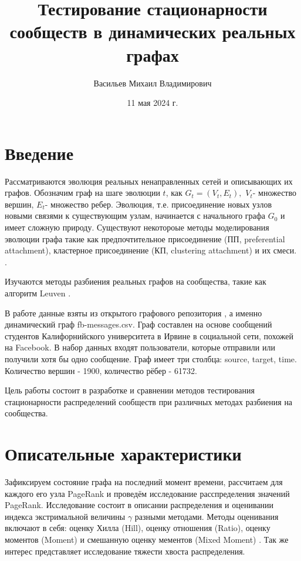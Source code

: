 \documentclass[a4paper,12pt]{article}
\begin{document}
\title{Тестирование стационарности сообществ в динамических реальных графах}



\author{Васильев Михаил Владимирович}


\date{11 мая 2024 г.}%
             



\maketitle

\section{Введение}
	Рассматриваются эволюция реальных ненаправленных сетей и описывающих их графов. 
	Обозначим граф на шаге эволюции $t$, как $G_{t}=(V_{t},E_{t}),$ $V_{t}$- множество вершин, $E_{t}$- множество ребер. Эволюция, т.е. присоединение новых узлов новыми связями к существующим узлам, начинается с начального графа $G_{0}$ и имеет сложную природу. Существуют некотороые методы моделирования эволюции графа такие как предпочтительное присоединение (ПП, preferential attachment), кластерное присоединение (КП, clustering attachment) и их смеси. \cite{book9}.
	
	Изучаются методы разбиения реальных графов на сообщества, такие как алгоритм Leuven \cite{book8}. 
	
	В работе данные взяты из открытого графового репозитория \cite{book2}, а именно динамический граф fb-messages.csv. Граф составлен на основе сообщений студентов Калифорнийского университета в Ирвине в социальной сети, похожей на Facebook. В набор данных входят пользователи, которые отправили или получили хотя бы одно сообщение. Граф имеет три столбца: source, target, time. Количество вершин - 1900, количество рёбер - 61732.	
	
	Цель работы состоит в разработке и сравнении методов тестирования стационарности распределений сообществ при различных методах разбиения на сообщества.



\section{Описательные характеристики}
	Зафиксируем состояние графа на последний момент времени, рассчитаем для каждого его узла PageRank и проведём исследование расспределения значений PageRank. Исследование состоит в описании распределения и оценивании индекса экстримальной величины $\gamma$ разными методами. Методы оценивания включают в себя: оценку Хилла (Hill), оценку отношения (Ratio), оценку моментов (Moment) \cite{book10} и смешанную оценку мементов (Mixed Moment) \cite{book11}. Так же интерес представляет исследование тяжести хвоста распределения.
\end{document}
